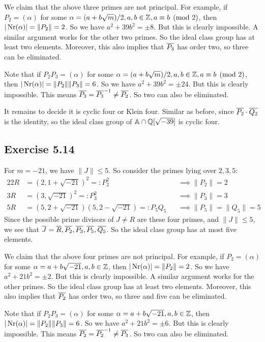 \documentclass[../Marcus.tex]{subfiles}
\begin{document}
We claim that the above three primes are not principal. For example, if $P_2 = (\alpha)$ for some $\alpha = (a+b\sqrt{m})/2,a,b\in\mathbb{Z},a \equiv b \pmod{2}$, then $|\operatorname{Nr}(\alpha)| = \|P_2\| = 2$. So we have $a^2+39b^2 = \pm8$. But this is clearly impossible. A similar argument works for the other two primes. So the ideal class group has at least two elements. Moreover, this also implies that $\overline{P_3}$ has order two, so three can be eliminated.

Note that if $P_2P_3 = (\alpha)$ for some $\alpha = (a+b\sqrt{m})/2,a,b\in\mathbb{Z},a \equiv b \pmod{2}$, then $|\operatorname{Nr}(\alpha)| = \|P_2\|\|P_3\| = 6$. So we have $a^2+39b^2 = \pm24$. But this is clearly impossible. This means $\overline{P_3} = \overline{P_3}^{-1} \neq \overline{P_2}$. So two can also be eliminated.

It remains to decide it is cyclic four or Klein four. Similar as before, since $\overline{P_2} \cdot \overline{Q_2}$ is the identity, so the ideal class group of $\mathbb{A} \cap \mathbb{Q}[\sqrt{-39}]$ is cyclic four.

\subsection*{Exercise 5.14}

For $m=-21$, we have $\|J\| \leq 5$. So consider the primes lying over $2,3,5$:
\begin{alignat*}{2}
2R &= (2,1+\sqrt{-21})^2 =: P_2^2  &&\implies \|P_2\| = 2    \\
3R &= (3,\sqrt{-21})^2 =: P_3^2     &&\implies \|P_3\| = 3    \\
5R &= (5,2+\sqrt{-21})(5,2-\sqrt{-21}) =: P_5Q_5  &&\implies \|P_5\| = \|Q_5\| = 5
\end{alignat*}
Since the possible prime divisors of $J\neq R$ are these four primes, and $\|J\| \leq 5$, we see that $\overline{J}=\overline{R},\overline{P_2},\overline{P_3},\overline{P_5},\overline{Q_5}$. So the ideal class group has at most five elements.

We claim that the above four primes are not principal. For example, if $P_2 = (\alpha)$ for some $\alpha=a+b\sqrt{-21},a,b\in \mathbb{Z}$, then $|\operatorname{Nr}(\alpha)| = \|P_2\| = 2$. So we have $a^2+21b^2 = \pm2$. But this is clearly impossible. A similar argument works for the other primes. So the ideal class group has at least two elements. Moreover, this also implies that $\overline{P_2}$ has order two, so three and five can be eliminated.

Note that if $P_2P_3 = (\alpha)$ for some $\alpha=a+b\sqrt{-21},a,b\in \mathbb{Z}$, then $|\operatorname{Nr}(\alpha)| = \|P_2\|\|P_3\| = 6$. So we have $a^2+21b^2 = \pm6$. But this is clearly impossible. This means $\overline{P_2} = \overline{P_2}^{-1} \neq \overline{P_3}$. So two can also be eliminated.
\end{document}
